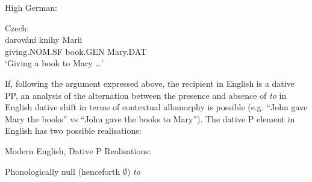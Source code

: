 	\begin{exe}
		\ex High German:\label{german-nom}
		\begin{xlist}

		\end{xlist}
		\ex Czech:\label{czech-nom}\\
		\gll darov\'{a}n\'{i} knihy Marii\\
		giving.NOM.SF book.GEN Mary.DAT\\
		\trans `Giving a book to Mary \ldots \citep[ex. 14]{Dvorak.2009}'
	\end{exe}

	If, following the argument expressed above, the recipient in English is a dative PP, an analysis of the alternation between the presence and absence of \textit{to} in English dative shift in terms of contextual allomorphy is possible (e.g. ``John gave Mary the books'' vs ``John gave the books to Mary''). The dative P element in English has two possible realisations:

	\begin{exe}
		\ex Modern English, Dative P Realisations:
		\begin{xlist}
			\ex Phonologically null\label{ex:k-null} (henceforth $\emptyset$)
			\ex \textit{to}\label{ex:k-to}
		\end{xlist}
	\end{exe}

